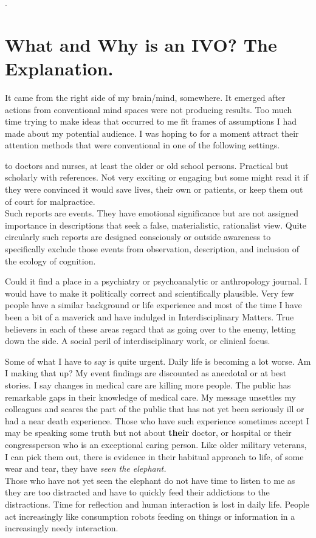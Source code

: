 .\section{What and Why is an IVO? The Explanation.}
 It came from the right side of my brain/mind, somewhere. It emerged after actions from conventional mind spaces were not producing results. Too much time trying to make ideas that occurred to me fit frames of assumptions I had made about my potential audience. I was hoping to for a moment attract their attention   methods that were conventional in one of the following settings.


\par {} to doctors and nurses, at least the older or old school persons. Practical but scholarly with references. Not very exciting or engaging but some might read it if they were convinced it would save lives, their own or patients, or keep them out of court for malpractice. \\Such reports are events. They have emotional significance but are not assigned importance in descriptions that seek a false, materialistic, rationalist view. Quite circularly such reports are designed consciously or outside awareness to specifically exclude those events from observation, description, and inclusion of the ecology of cognition.
\pagebreak


\par{} Could it find a place in a psychiatry or psychoanalytic or anthropology journal.
I would have to make it politically correct and scientifically  plausible.  Very few people have a similar background or life experience and most of the time I have been a bit of a maverick and have indulged in Interdisciplinary Matters. True believers in each of these areas regard that as going over to the enemy, letting down the side. A social peril of interdisciplinary work, or clinical focus. 


\par{}  Some of what I have to say is quite urgent.
Daily life is becoming a lot worse. Am I making that up? My event findings are discounted as anecdotal or at best stories. I say changes in medical care are killing more people. The public has remarkable gaps in their knowledge of medical care.  My message unsettles my colleagues and scares the part of the public that has not yet been seriously ill or had a near death experience. Those who have such experience sometimes accept I may be speaking some truth but not about \textbf{their} doctor, or hospital or their congressperson who is an exceptional caring person.  Like older military veterans, I can pick them out, there is evidence in their habitual approach to life, of some wear and tear, they have \emph{seen the elephant.} \\Those who have not yet seen the elephant do not have time to listen to me as they are too distracted and have to quickly feed their addictions to the distractions. Time for reflection and human interaction is lost in daily life. People act increasingly like consumption robots feeding on things or information in a increasingly needy interaction. 

